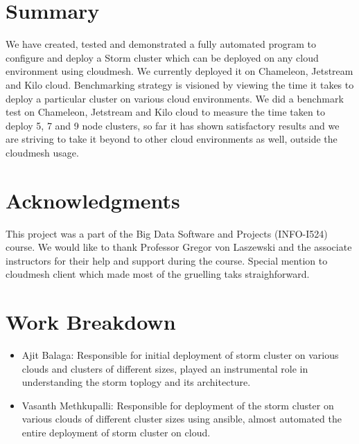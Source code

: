 \documentclass[9pt,twocolumn,twoside]{../../styles/osajnl}
\begin{document}
\section{Summary}

We have created, tested and demonstrated a fully automated program to
configure and deploy a Storm cluster which can be deployed on any
cloud environment using cloudmesh. We currently deployed it on
Chameleon, Jetstream and Kilo cloud. Benchmarking strategy is visioned
by viewing the time it takes to deploy a particular cluster on various
cloud environments. We did a benchmark test on Chameleon, Jetstream
and Kilo cloud to measure the time taken to deploy 5, 7 and 9 node
clusters, so far it has shown satisfactory results and we are striving
to take it beyond to other cloud environments as well, outside the
cloudmesh usage.

\section{Acknowledgments}
This project was a part of the Big Data Software and Projects
(INFO-I524) course. We would like to thank Professor Gregor von
Laszewski and the associate instructors for their help and support
during the course. Special mention to cloudmesh client which made most
of the gruelling taks straighforward.




\appendix

\section{Work Breakdown}

\begin{itemize}

\item Ajit Balaga: Responsible for initial deployment of storm cluster
  on various clouds and clusters of different sizes, played an
  instrumental role in understanding the storm toplogy and its
  architecture.

\item Vasanth Methkupalli: Responsible for deployment of the storm
  cluster on various clouds of different cluster sizes using ansible,
  almost automated the entire deployment of storm cluster on cloud.

\end{itemize}
\end{document}
